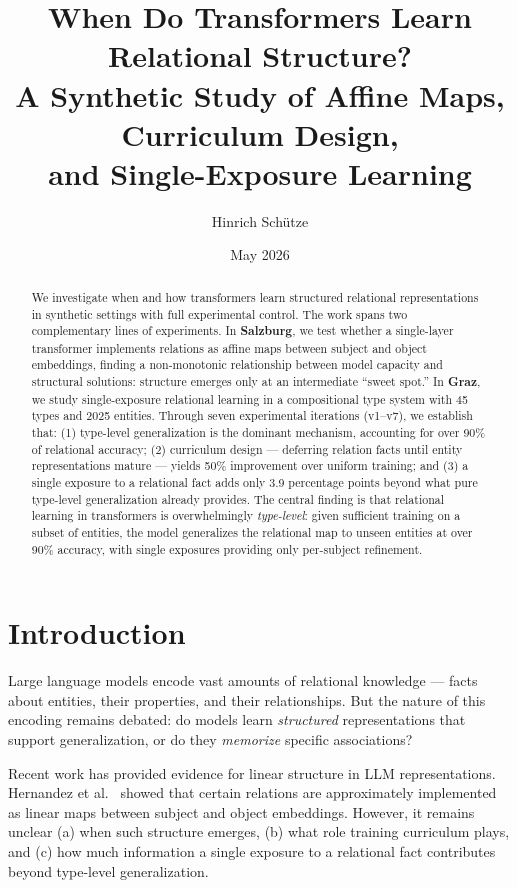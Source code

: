 \documentclass[11pt]{article}
\title{When Do Transformers Learn Relational Structure?\\
A Synthetic Study of Affine Maps, Curriculum Design,\\
and Single-Exposure Learning}
\author{Hinrich Sch\"utze}
\date{May 2026}
\begin{document}
\maketitle

\begin{abstract}
We investigate when and how transformers learn structured relational
representations in synthetic settings with full experimental control.
The work spans two complementary lines of experiments.
In \textbf{Salzburg}, we test whether a single-layer transformer implements
relations as affine maps between subject and object embeddings, finding a
non-monotonic relationship between model capacity and structural solutions:
structure emerges only at an intermediate ``sweet spot.''
In \textbf{Graz}, we study single-exposure relational learning in a
compositional type system with 45 types and 2025 entities.  Through seven
experimental iterations (v1--v7), we establish that: (1) type-level
generalization is the dominant mechanism, accounting for over 90\% of relational
accuracy; (2) curriculum design --- deferring relation facts until entity
representations mature --- yields 50\% improvement over uniform training; and
(3) a single exposure to a relational fact adds only 3.9 percentage points
beyond what pure type-level generalization already provides.  The central
finding is that relational learning in transformers is overwhelmingly
\emph{type-level}: given sufficient training on a subset of entities, the model
generalizes the relational map to unseen entities at over 90\% accuracy, with
single exposures providing only per-subject refinement.
\end{abstract}

\tableofcontents
\newpage

\section{Introduction}

Large language models encode vast amounts of relational knowledge --- facts about
entities, their properties, and their relationships. But the nature of this encoding
remains debated: do models learn \emph{structured} representations that support
generalization, or do they \emph{memorize} specific associations?

Recent work has provided evidence for linear structure in LLM representations.
Hernandez et al.~\cite{hernandez2024} showed that certain relations are approximately
implemented as linear maps between subject and object embeddings. However, it remains
unclear (a) when such structure emerges, (b) what role training curriculum plays, and
(c) how much information a single exposure to a relational fact contributes beyond
type-level generalization.
\end{document}
